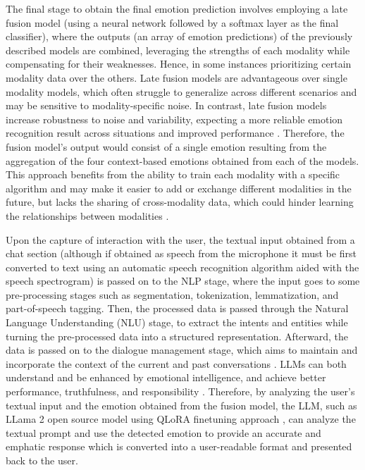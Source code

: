 \documentclass[runningheads]{llncs}
\begin{document}
The final stage to obtain the final emotion prediction involves employing a late fusion model (using a neural network followed by a softmax layer as the final classifier), where the outputs (an array of emotion predictions) of the previously described models are combined, leveraging the strengths of each modality while compensating for their weaknesses. Hence, in some instances prioritizing certain modality data over the others. Late fusion models are advantageous over single modality models, which often struggle to generalize across different scenarios and may be sensitive to modality-specific noise. In contrast, late fusion models increase robustness to noise and variability, expecting a more reliable emotion recognition result across situations and improved performance \cite{zhu_multimodal_2023, sleeman_multimodal_2022}. Therefore, the fusion model's output would consist of a single emotion resulting from the aggregation of the four context-based emotions obtained from each of the models. This approach benefits from the ability to train each modality with a specific algorithm and may make it easier to add or exchange different modalities in the future, but lacks the sharing of cross-modality data, which could hinder learning the relationships between modalities \cite{sleeman_multimodal_2022}.


Upon the capture of interaction with the user, the textual input obtained from a chat section (although if obtained as speech from the microphone it must be first converted to text using an automatic speech recognition algorithm aided with the speech spectrogram) is passed on to the NLP stage, where the input goes to some pre-processing stages such as segmentation, tokenization, lemmatization, and part-of-speech tagging. Then, the processed data is passed through the Natural Language Understanding (NLU) stage, to extract the intents and entities while turning the pre-processed data into a structured representation. Afterward, the data is passed on to the dialogue management stage, which aims to maintain and incorporate the context of the current and past conversations \cite{rizou_multilingual_2022}. LLMs can both understand and be enhanced by emotional intelligence, and achieve better performance, truthfulness, and responsibility \cite{li_large_2023}. Therefore, by analyzing the user's textual input and the emotion obtained from the fusion model, the LLM, such as LLama 2 open source model using QLoRA finetuning approach \cite{Dettmers2023}, can analyze the textual prompt and use the detected emotion to provide an accurate and emphatic response which is converted into a user-readable format and presented back to the user.
\end{document}
